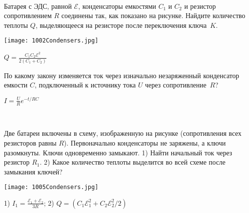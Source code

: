 \begin{ex}
\hspace{0pt} \\
\begin{minipage}{.65\textwidth}
Батарея с ЭДС, равной $\mathcal{E}$, конденсаторы емкостями $C_1$ и $C_2$ и резистор сопротивлением $R$ соединены так, как показано на рисунке. 
Найдите количество теплоты $Q$, выделяющееся на резисторе после переключения ключа~$K$.
\end{minipage}
\begin{minipage}{.35\textwidth}
\centering
\texttt{[image: 1002Condensers.jpg]}
\end{minipage}
\begin{ans}
$Q=\frac{C_1C_2 \mathcal{E}^2}{2(C_1+C_2)}$
\end{ans}
\end{ex}

\begin{ex} 
По какому закону изменяется ток через изначально незаряженный конденсатор емкости $C$, подключенный к источнику тока $U$ через сопротивление~$R$?
\begin{ans}
$I = \frac{U}{R} e^{-t/RC}$
\end{ans}
\end{ex}

\begin{ex} 
\hspace{0pt} \\
\begin{minipage}{.65\textwidth}
Две батареи включены в схему, изображенную на рисунке (сопротивления всех резисторов равны $R$). 
Первоначально конденсаторы не заряжены, а ключи разомкнуты. Ключи одновременно замыкают. 
1) Найти начальный ток через резистор $R_1$. 2) Какое количество теплоты выделится во всей схеме после замыкания ключей?
\end{minipage}
\begin{minipage}{.35\textwidth}
\centering
\texttt{[image: 1005Condensers.jpg]}
\end{minipage}
\begin{ans}
1) $I_1=\frac{\mathcal{E}_1 + \mathcal{E}_2}{3R}$; 2) $Q=(C_1 \mathcal{E}_1^2 + C_2 \mathcal{E}_2^2/2)$
\end{ans}
\end{ex}


